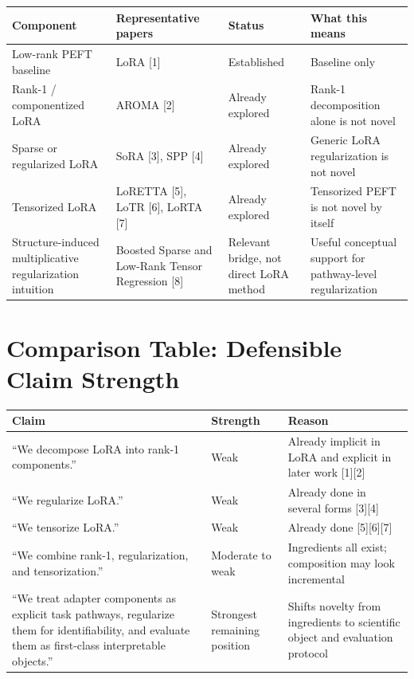 \documentclass[11pt]{article}
\begin{document}
\begin{longtable}{>{\raggedright\arraybackslash}p{} >{\raggedright\arraybackslash}p{} >{\raggedright\arraybackslash}p{} >{\raggedright\arraybackslash}p{}}
\toprule
Component & Representative papers & Status & What this means \\
\midrule
\endhead
Low-rank PEFT baseline & LoRA [1] & Established & Baseline only \\
Rank-1 / componentized LoRA & AROMA [2] & Already explored & Rank-1 decomposition alone is not novel \\
Sparse or regularized LoRA & SoRA [3], SPP [4] & Already explored & Generic LoRA regularization is not novel \\
Tensorized LoRA & LoRETTA [5], LoTR [6], LoRTA [7] & Already explored & Tensorized PEFT is not novel by itself \\
Structure-induced multiplicative regularization intuition & Boosted Sparse and Low-Rank Tensor Regression [8] & Relevant bridge, not direct LoRA method & Useful conceptual support for pathway-level regularization \\
\bottomrule
\end{longtable}

\section{Comparison Table: Defensible Claim Strength}

\begin{longtable}{>{\raggedright\arraybackslash}p{} >{\raggedright\arraybackslash}p{} >{\raggedright\arraybackslash}p{}}
\toprule
Claim & Strength & Reason \\
\midrule
\endhead
``We decompose LoRA into rank-1 components.'' & Weak & Already implicit in LoRA and explicit in later work [1][2] \\
``We regularize LoRA.'' & Weak & Already done in several forms [3][4] \\
``We tensorize LoRA.'' & Weak & Already done [5][6][7] \\
``We combine rank-1, regularization, and tensorization.'' & Moderate to weak & Ingredients all exist; composition may look incremental \\
``We treat adapter components as explicit task pathways, regularize them for identifiability, and evaluate them as first-class interpretable objects.'' & Strongest remaining position & Shifts novelty from ingredients to scientific object and evaluation protocol \\
\bottomrule
\end{longtable}
\end{document}
